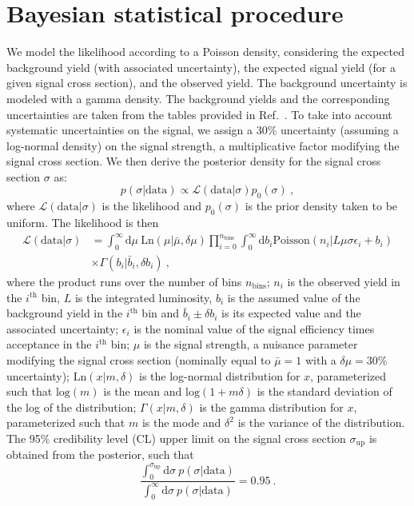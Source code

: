 \section{Bayesian statistical procedure}
We model the likelihood according to a Poisson density,
considering the expected background yield (with associated
uncertainty), the expected signal yield (for a given signal cross
section), and the observed yield. The background uncertainty is modeled with a gamma density. The
background yields and the corresponding uncertainties are taken from the tables provided
in Ref.~\cite{RazorHgaga}. To take into account systematic
uncertainties on the signal, we assign a 30\% uncertainty (assuming a
log-normal density) on the signal strength, a multiplicative
factor modifying the signal cross section. We then derive the
posterior density for the signal cross section $\sigma$ as:
\begin{equation}
p(\sigma|\mathrm{data}) \propto \mathcal L(\mathrm{data} |\sigma)p_0(\sigma)~,
\label{eqn:posterior}
\end{equation}
where $\mathcal L(\mathrm{data} |\sigma)$ is the likelihood and $p_0(\sigma)$ is the prior density taken to be
uniform. The likelihood is then
\begin{align}
\mathcal L(\mathrm{data} |\sigma) &=\int_{0}^{\infty}\mathrm{d}\mu~\mathrm{Ln}(\mu|\bar\mu,\delta\mu)\prod_{i=0}^{n_{\mathrm{bins}}}\int_0^{\infty} \mathrm{d}b_i
   \mathrm{Poisson}(n_i|L\mu\sigma\epsilon_i+ b_i)\nonumber\\
&\times\Gamma(b_i|\bar{b}_i,\delta b_i)~,
\label{eqn:likelihood}
\end{align}
where the product runs over the number of bins $n_{\mathrm{bins}}$; $n_i$ is the
observed yield in the $i^{\mathrm{th}}$ bin, $L$ is the integrated
luminosity, $b_i$ is the assumed value of the background yield in the
$i^{\mathrm{th}}$ bin and $\bar{b}_i\pm \delta b_i$ is its expected value
and the associated uncertainty; $\epsilon_i$ is the nominal value
of the signal efficiency times acceptance in the $i^{\mathrm{th}}$ bin; $\mu$ is the
signal strength, a nuisance parameter modifying the signal cross section
(nominally equal to $\bar\mu=1$ with a $\delta\mu=30\%$ uncertainty);
$\mathrm{Ln}(x|m,\delta)$ is the log-normal
distribution for $x$, parameterized such that $\mathrm{log}(m)$ is the
mean and $\mathrm{log}(1+m\delta)$ is the standard deviation of the
log of the distribution; $\Gamma(x|m,\delta)$ is the gamma
distribution for $x$, parameterized such that $m$ is the
mode and $\delta^2$ is the variance of the distribution. The 95\%
credibility level (CL) upper limit on the
signal cross section $\sigma_{\mathrm{up}}$ is obtained from the
posterior, such that 
\begin{equation}
\frac{\int_0^{\sigma_{\mathrm{up}}}\mathrm{d}\sigma~ p(\sigma|\mathrm{data})}{\int_0^{\infty}\mathrm{d}\sigma~ p(\sigma|\mathrm{data})} = 0.95~.
\end{equation}

